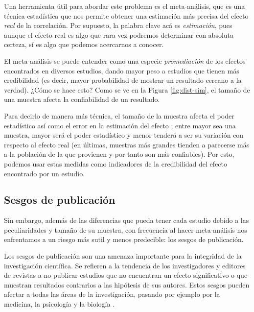 \documentclass[
  bookmarksnumbered]{article}
\begin{document}
Una herramienta útil para abordar este problema es el meta-análisis, que es una técnica estadística que nos permite obtener una estimación más precisa del efecto \emph{real} de la correlación. Por supuesto, la palabra clave acá es \emph{estimación}, pues aunque el efecto real es algo que rara vez podremos determinar con absoluta certeza, sí es algo que podemos acercarnos a conocer.

El meta-análisis se puede entender como una especie \emph{promediación} de los efectos encontrados en diversos estudios, dando mayor peso a estudios que tienen más credibilidad (es decir, mayor probabilidad de mostrar un resultado cercano a la verdad). ¿Cómo se hace esto? Como se ve en la Figura \ref{fig:dist-sim}, el tamaño de una muestra afecta la confiabilidad de un resultado.

Para decirlo de manera más técnica, el tamaño de la muestra afecta el poder estadístico así como el error en la estimación del efecto \autocite{leongomezPoderRvid2020,leongomezAnalisisPoderEstadistico2020}; entre mayor sea una muestra, mayor será el poder estadístico y menor tenderá a ser su variación con respecto al efecto real (en últimas, muestras más grandes tienden a parecerse más a la población de la que provienen y por tanto son más confiables). Por esto, podemos usar estas medidas como indicadores de la credibilidad del efecto encontrado por un estudio.

\hypertarget{sesgos-de-publicaciuxf3n}{%
\subsection{Sesgos de publicación}\label{sesgos-de-publicaciuxf3n}}

Sin embargo, además de las diferencias que pueda tener cada estudio debido a las peculiaridades y tamaño de su muestra, con frecuencia al hacer meta-análisis nos enfrentamos a un riesgo más sutil y menos predecible: los sesgos de publicación.

Los sesgos de publicación son una amenaza importante para la integridad de la investigación científica. Se refieren a la tendencia de los investigadores y editores de revistas a no publicar estudios que no encuentran un efecto significativo o que muestran resultados contrarios a las hipótesis de sus autores. Estos sesgos pueden afectar a todas las áreas de la investigación, pasando por ejemplo por la medicina, la psicología y la biología \autocites[e.g.,][]{baker500ScientistsLift2016,kleinManyLabsInvestigating2018}.
\end{document}
